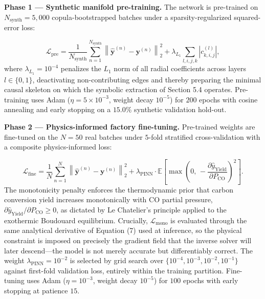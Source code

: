 \documentclass[10pt,journal,onecolumn]{IEEEtran}
\begin{document}
\textbf{Phase 1 — Synthetic manifold pre-training.} The network is pre-trained on $N_{\text{synth}} = 5,000$ copula-bootstrapped batches under a sparsity-regularized squared-error loss:

\begin{equation}
\mathcal{L}_{\text{pre}} = \frac{1}{N_{\text{synth}}} \sum_{n=1}^{N_{\text{synth}}} \left\|\hat{\mathbf{y}}^{(n)} - \mathbf{y}^{(n)}\right\|_2^2 + \lambda_{L_1} \sum_{l,i,j,k} \left|c_{k,i,j}^{(l)}\right|,
\end{equation}
where $\lambda_{L_1} = 10^{-4}$ penalizes the $L_1$ norm of all radial coefficients across layers $l \in \{0, 1\}$, deactivating non-contributing edges and thereby preparing the minimal causal skeleton on which the symbolic extraction of Section 5.4 operates. Pre-training uses Adam ($\eta = 5 \times 10^{-3}$, weight decay $10^{-5}$) for $200$ epochs with cosine annealing and early stopping on a $15.0\%$ synthetic validation hold-out.

\textbf{Phase 2 — Physics-informed factory fine-tuning.} Pre-trained weights are fine-tuned on the $N = 50$ real batches under $5$-fold stratified cross-validation with a composite physics-informed loss:

\begin{equation}
\mathcal{L}_{\text{fine}} = \frac{1}{N} \sum_{n=1}^{N} \left\|\hat{\mathbf{y}}^{(n)} - \mathbf{y}^{(n)}\right\|_2^2 + \lambda_{\text{PINN}} \cdot \mathbb{E}\!\left[\max\!\left(0,\, -\frac{\partial \hat{y}_{\text{Yield}}}{\partial P_{\text{CO}}}\right)^{\!2}\right].
\end{equation}
The monotonicity penalty enforces the thermodynamic prior that carbon conversion yield increases monotonically with CO partial pressure, $\partial \hat{y}_{\text{Yield}} / \partial P_{\text{CO}} \ge 0$, as dictated by Le Chatelier's principle applied to the exothermic Boudouard equilibrium. Crucially, $\mathcal{L}_{\text{mono}}$ is evaluated through the same analytical derivative of Equation (7) used at inference, so the physical constraint is imposed on precisely the gradient field that the inverse solver will later descend—the model is not merely accurate but differentiably correct. The weight $\lambda_{\text{PINN}} = 10^{-2}$ is selected by grid search over $\{10^{-4}, 10^{-3}, 10^{-2}, 10^{-1}\}$ against first-fold validation loss, entirely within the training partition. Fine-tuning uses Adam ($\eta = 10^{-3}$, weight decay $10^{-5}$) for $100$ epochs with early stopping at patience $15$.
\end{document}
